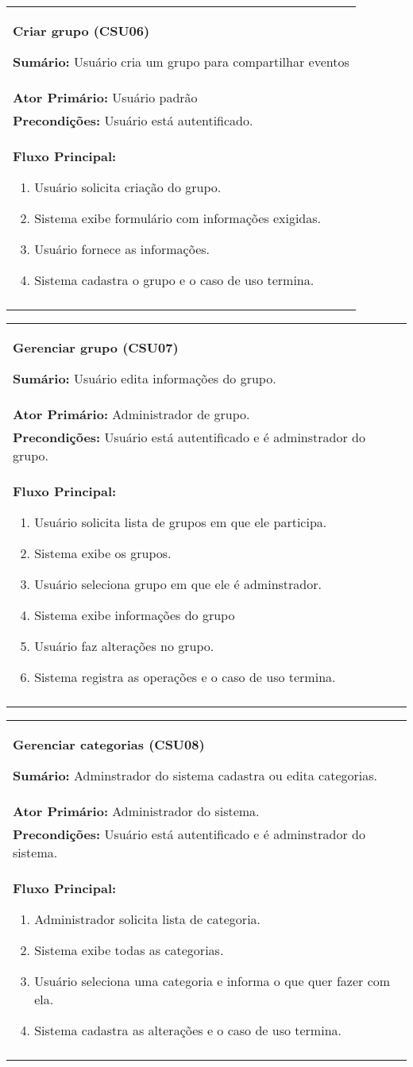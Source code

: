 \documentclass{article}
\newcommand{\sumario}[1] {\textbf{Sumário:} #1\\ }
\newcommand{\ator}[1] {\textbf{Ator Primário:} #1\\}
\newcommand{\precond}[1] {\textbf{Precondições:} #1\\}
\newcommand{\fluxo}{\textbf{Fluxo Principal:}}
\newenvironment{boxed}[1]
			    {
			\begin{center}
			    \begin{tabular}{|p{\textwidth}|}
			    \hline
			\begin{center}
				{\large \textbf{#1}}
			\end{center}
			    }
			    { 
			    \\\\\hline
			    \end{tabular} 
			    \end{center}
			    }
\begin{document}
			\begin{boxed}{Criar grupo (CSU06)}
			\sumario{Usuário cria um grupo para compartilhar eventos}
		 	\ator{Usuário padrão }
			 \precond{Usuário está autentificado.}
			\fluxo
			\begin{enumerate}[itemsep=0mm]
			\item Usuário solicita criação do grupo.
			\item Sistema exibe formulário com informações exigidas.
			\item Usuário fornece as informações.
			\item Sistema cadastra o grupo e o caso de uso termina.
			\end{enumerate}
			\end{boxed}
			
			\begin{boxed}{Gerenciar grupo (CSU07)}
		  	\sumario{Usuário edita informações do grupo.}
			 \ator{Administrador de grupo.}
			 \precond{Usuário está autentificado e é adminstrador do grupo.}
			\fluxo
			\begin{enumerate}[itemsep=0mm]
			\item Usuário solicita lista de grupos em que ele participa.
			\item Sistema exibe os grupos.
			\item Usuário seleciona grupo em que ele é adminstrador.
			\item Sistema exibe informações do grupo
			\item Usuário faz alterações no grupo.
			\item Sistema registra as operações e o caso de uso termina.
			\end{enumerate}
			\end{boxed}
			
			\begin{boxed}{Gerenciar categorias (CSU08)}
			\sumario{Adminstrador do sistema cadastra ou edita categorias.}
			\ator{Administrador do sistema.}
			\precond{Usuário está autentificado e é adminstrador do sistema.}
			\fluxo
			\begin{enumerate}[itemsep=0mm]
			\item Administrador solicita lista de categoria.
			\item Sistema exibe todas as categorias.
			\item Usuário seleciona uma categoria e informa o que quer fazer com ela.
			\item Sistema cadastra as alterações e o caso de uso termina.
			\end{enumerate}
			\end{boxed}
				
\end{document}
